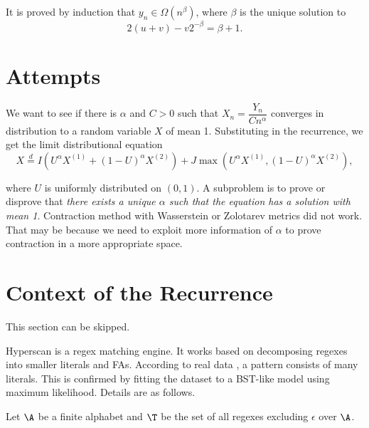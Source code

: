 It is proved by induction that $y_n \in \Omega(n^\beta)$, where $\beta$ is the unique solution to
$$2(u+v) - v2^{-\beta} = \beta+1.$$

\section{Attempts}
We want to see if there is $\alpha$ and $C > 0$ such that $X_n = \dfrac{Y_n}{Cn^\alpha}$ converges in distribution to a random variable $X$ of mean 1. Substituting in the recurrence, we get the limit distributional equation
\begin{equation}
  \label{eq:yield_limit_distributional_equation}
  X \stackrel{d}{=} I\left(U^\alpha X^{(1)} + (1-U)^\alpha X^{(2)}\right) + J\max\left(U^\alpha X^{(1)}, (1-U)^\alpha X^{(2)}\right),
\end{equation}

where $U$ is uniformly distributed on $(0,1)$. A subproblem is to prove or disprove that \textit{there exists a unique $\alpha$ such that the equation has a solution with mean 1}. Contraction method with Wasserstein or Zolotarev metrics did not work. That may be because we need to exploit more information of $\alpha$ to prove contraction in a more appropriate space.


\section{Context of the Recurrence}
\label{sec:yield_context}

\begin{note}
  This section can be skipped.
\end{note}

Hyperscan is a regex matching engine. It works based on decomposing regexes into smaller literals and FAs. According to real data \cite{snort_rules_2026}, a pattern consists of many literals. This is confirmed by fitting the dataset to a BST-like model \cite{nicaud2010average} using maximum likelihood. Details are as follows.

Let $\A$ be a finite alphabet and $\T$ be the set of all regexes excluding $\epsilon$ over $\A$.

